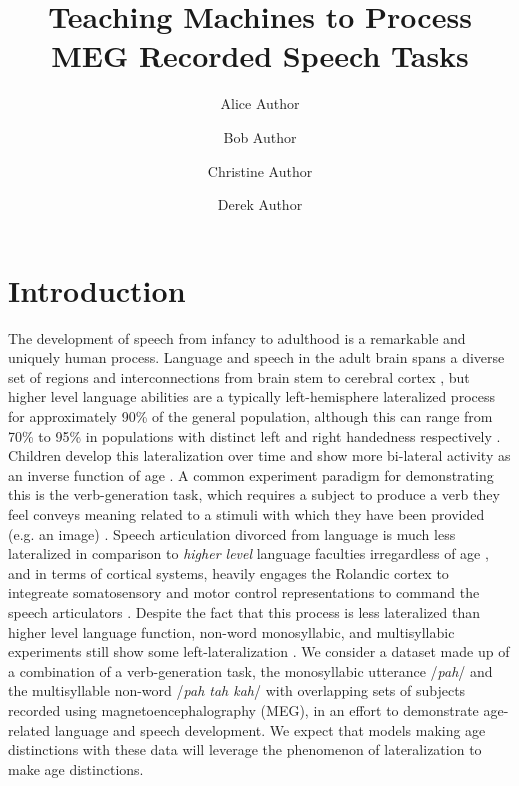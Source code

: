 \documentclass[fleqn,10pt]{wlscirep}
\title{Teaching Machines to Process MEG Recorded Speech Tasks}
\author[1,*]{Alice Author}
\author[2]{Bob Author}
\author[1,2,+]{Christine Author}
\author[2,+]{Derek Author}
\affil[1]{Affiliation, department, city, postcode, country}
\affil[2]{Affiliation, department, city, postcode, country}
\affil[*]{corresponding.author@email.example}
\affil[+]{these authors contributed equally to this work}
\begin{document}
\flushbottom
\maketitle

\thispagestyle{empty}

\section*{Introduction}

The development of speech from infancy to adulthood is a remarkable and uniquely human process. Language and speech in the adult brain spans a diverse set of regions and interconnections from brain stem to cerebral cortex \cite{GuentherBook, Tourville2011, Hillis}, but higher level language abilities are a typically left-hemisphere lateralized process for approximately 90\% of the general population, although this  can range from 70\% to 95\% in populations with distinct left and right handedness respectively \cite{GuentherBook, Kadis2011, Yu2014}. Children develop this lateralization over time and show more bi-lateral activity as an inverse function of age \cite{Kadis2011, Ressel2008}. A common experiment paradigm for demonstrating this is the verb-generation task, which requires a subject to produce a verb they feel conveys meaning related to a stimuli with which they have been provided (e.g. an image) \cite{Kadis2011}. Speech articulation divorced from language is much less lateralized in comparison to {\em higher level} language faculties irregardless of age \cite{GuentherBook}, and in terms of cortical systems, heavily engages the Rolandic cortex to integreate somatosensory and motor control representations to command the speech articulators \cite{GuentherBook}. Despite the fact that this process is less lateralized than higher level language function, non-word monosyllabic, and multisyllabic experiments still show some left-lateralization \cite{Ghosh2008a}. We consider a dataset made up of a combination of a verb-generation task, the monosyllabic utterance /{\em pah}/ and the multisyllable non-word /{\em pah tah kah}/ with overlapping sets of subjects recorded using magnetoencephalography (MEG), in an effort to demonstrate age-related language and speech development. We expect that models making age distinctions with these data will leverage the phenomenon of lateralization to make age distinctions.
\end{document}
